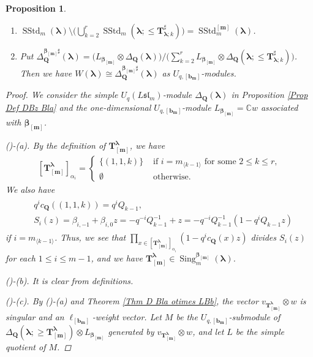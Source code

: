 \documentclass[12pt]{amsart}
\newtheorem{prop}[thm]{Proposition}
\numberwithin{equation}{thm}
\newcommand\CC{\mathbb C}
\newcommand\bQ{\mathbf Q}
\newcommand\bT{\mathbf T}
\newcommand\bb{\mathbf b}
\renewcommand\bm{\mathbf m} %
\renewcommand\a{\alpha}  %
\renewcommand\b{\beta}   %
\newcommand\D{\Delta}
\newcommand\Bb{\boldsymbol\beta}
\newcommand\Bla{\boldsymbol\lambda}
\newcommand\lan{\langle}
\newcommand\ran{\rangle}
\newcommand\Fsl{\mathfrak{sl}}
\newcommand{\SStd}{\operatorname{SStd}}
\newcommand{\Sing}{\operatorname{Sing}}
\newcounter{ichi}
\newcommand{\roi}{\roman{ichi}}
\newcounter{ni}
\begin{document}
\begin{prop}
\begin{enumerate}
\begin{enumerate}
\item 
$\SStd_m(\Bla) \setminus \big( \bigcup_{k=2}^r \SStd_m(\Bla; \leq \bT^{\sharp}_{\Bla;k} )\big) = \SStd_m^{[\bm]}(\Bla)$. 

\item 
Put $\D_{\bQ}^{\Bb_{[\bm]} \sharp} (\Bla) 
	= \big( L_{\Bb_{[\bm]}} \otimes \D_{\bQ}(\Bla) \big) 
			/ \big( \sum_{k=2}^r L_{\Bb_{[\bm]}} \otimes \D_{\bQ} (\Bla ; \leq \bT^{\sharp}_{\Bla;k}) \big)$. 
Then we have $W(\Bla) \cong \D_{\bQ}^{\Bb_{[\bm]} \sharp}(\Bla)$ as $U_{q,[\bb_{\bm}]}$-modules.  
\end{enumerate}
\end{enumerate}
\begin{proof}
We consider the simple $U_q (L\Fsl_m)$-module $\D_{\bQ} (\Bla)$ in Proposition \ref{Prop Def DBz Bla} 
and the one-dimensional $U_{q,[\bb_{\bm}]}$-module $L_{\Bb_{[\bm]}} = \CC w$ associated with $\Bb_{[\bm]}$. 


(\roi)-(a). 
By the definition of $\bT_{[\bm]}^{\Bla}$, we have 
\begin{align}
\label{bT bm Bla ai} 
[\bT_{[\bm]}^{\Bla}]_{\a_i} = 
	\begin{cases}
	\{ (1,1,k) \} & \text{ if } i=m_{\lan k-1 \ran} \text{ for some } 2 \leq k \leq r, 
	\\
	\emptyset & \text{ otherwise}. 
	\end{cases}
\end{align}
We also have 
\begin{align}
\label{qicQ 11k}
\begin{split}
&q^i c_{\bQ} ((1,1,k)) = q^i Q_{k-1}, 
\\
& S_i(z) = \b_{i,-1} + \b_{i,0} z = - q^{-i} Q_{k-1}^{-1} + z = - q^{-i} Q_{k-1}^{-1} (1 - q^i Q_{k-1} z)
\end{split}
\end{align}
if $i= m_{\lan k-1 \ran}$. 
Thus, we see that $\prod_{x \in [\bT_{[\bm]}^{\Bla}]_{\a_i}} (1 - q^i c_{\bQ}(x) z)$ divides $S_i(z)$ for each $1 \leq i \leq m-1$, 
and we have $\bT_{[\bm]}^{\Bla} \in \Sing_m^{\Bb_{[\bm]}} (\Bla)$. 

(\roi)-(b). It is clear from definitions. 

(\roi)-(c). 
By (\roi)-(a) and Theorem \ref{Thm D Bla otimes LBb}, 
the vector $v_{\bT_{[\bm]}^{\Bla}} \otimes w$ is singular and an $\ell_{[\bb_{\bm}]}$-weight vector. 
Let  $M$ be the $U_{q,[\bb_{\bm}]} $-submodule of 
$\D_{\bQ}(\Bla ; \geq \bT_{[\bm]}^{\Bla}) \otimes L_{\Bb_{[\bm]}}$ 
generated by $v_{\bT_{[\bm]}^{\Bla}} \otimes w$, 
and let $L$ be the simple quotient of $M$. 



\end{proof}
\end{prop}
\end{document}
